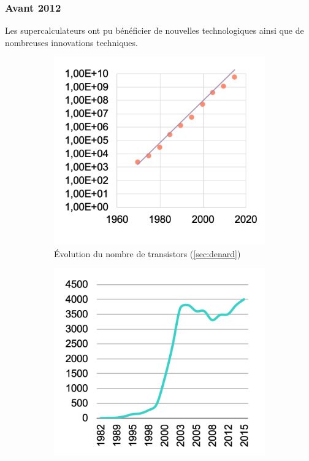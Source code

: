     \subsubsection{Avant 2012}\label{sec:proc_evo_2012}
    
        Les supercalculateurs ont pu bénéficier de nouvelles technologiques ainsi que de nombreuses innovations techniques.
        
        \begin{figure}[t!]
            \centering
            \begin{subfigure}[t]{0.33\textwidth}
                \centering
                \includegraphics[width=\linewidth]{images/evo_transistor.png}
                \caption{\label{fig:evo_transistor}Évolution du nombre de transistors (\autoref{sec:denard})}
            \end{subfigure}\hfill
            \begin{subfigure}[t]{0.33\textwidth}
                \centering
                \includegraphics[width=\linewidth]{images/evo_freq.png}

\end{subfigure}
\end{figure}
